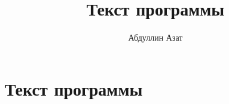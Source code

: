\documentclass[10pt,a4paper]{report}
\author{Абдуллин Азат}
\title{Текст программы}
\begin{document}
\maketitle
\renewcommand{\thesection}{\arabic{section}}
\tableofcontents
\pagebreak
	
\section{Текст программы}











\end{document}
